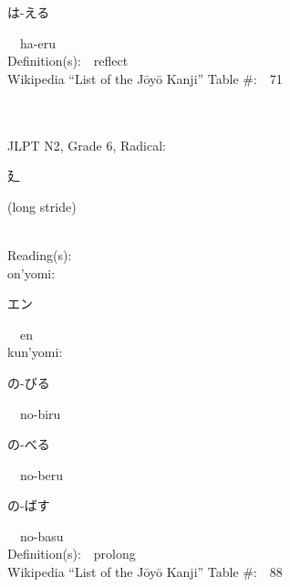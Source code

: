 \begin{multicols}{2}
{\hspace*{2em}}{\begin{CJK}{UTF8}{min} は-える \end{CJK}}\ \ ha-eru\ \ \\
Definition(s):\ \ reflect \\
Wikipedia ``List of the J\=oy\=o Kanji'' Table \#:\ \ 71 \\
\ \ \\
{\fontsize{34pt}{40pt}  }\ \ \\  %
{JLPT N2, Grade 6, Radical:\ \ {\begin{CJK}{UTF8}{min} 廴 \end{CJK}} (long stride) } \\
Reading(s):\ \ \\
{\hspace*{1em}}on'yomi:\ \ \\
{\hspace*{2em}}{\begin{CJK}{UTF8}{min} エン \end{CJK}}\ \ en\ \ \\
{\hspace*{1em}}kun'yomi:\ \ \\
{\hspace*{2em}}{\begin{CJK}{UTF8}{min} の-びる \end{CJK}}\ \ no-biru\ \ \\
{\hspace*{2em}}{\begin{CJK}{UTF8}{min} の-べる \end{CJK}}\ \ no-beru\ \ \\
{\hspace*{2em}}{\begin{CJK}{UTF8}{min} の-ばす \end{CJK}}\ \ no-basu\ \ \\
Definition(s):\ \ prolong \\
Wikipedia ``List of the J\=oy\=o Kanji'' Table \#:\ \ 88 \\
\ \ \\
{\fontsize{34pt}{40pt}  }\ \ \\  %

\end{multicols}
